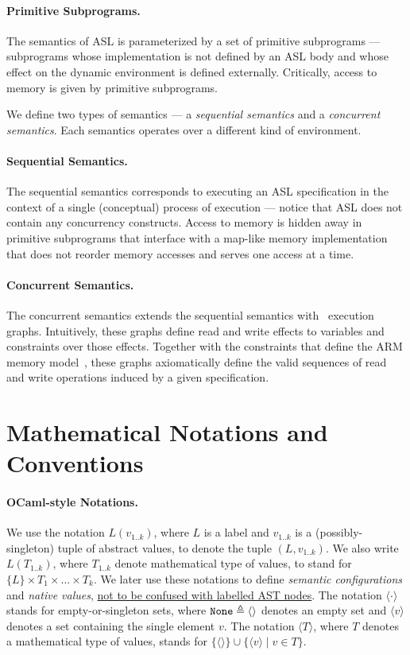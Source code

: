 \documentclass{book}
\begin{document}
\paragraph{Primitive Subprograms.}
The semantics of ASL is parameterized by a set of primitive subprograms ---
subprograms whose implementation is not defined by an ASL body and whose effect on the dynamic environment
is defined externally. Critically, access to memory is given by primitive subprograms.

We define two types of semantics --- a \emph{sequential semantics} and a \emph{concurrent semantics}.
Each semantics operates over a different kind of environment.

\paragraph{Sequential Semantics.}
The sequential semantics corresponds to executing an ASL specification in the context of a single (conceptual) process
of execution --- notice that ASL does not contain any concurrency constructs. Access to memory is hidden away
in primitive subprograms that interface with a map-like memory implementation that does not reorder memory accesses
and serves one access at a time.

\paragraph{Concurrent Semantics.}
The concurrent semantics extends the sequential semantics with \herd\ execution graphs.
Intuitively, these graphs define read and write effects to variables and constraints over those effects.
Together with the constraints that define the ARM memory model~\cite{AlglaveDGHM21}, these graphs axiomatically define
the valid sequences of read and write operations induced by a given specification.

\section{Mathematical Notations and Conventions}



\paragraph{OCaml-style Notations.}
We use the notation $L(v_{1..k})$, where $L$ is a label and $v_{1..k}$ is a (possibly-singleton) tuple of abstract values,
to denote the tuple $(L,v_{1..k})$.
We also write $L(T_{1..k})$, where $T_{1..k}$ denote mathematical type of values, to stand for
$\{L\} \times T_1 \times \ldots \times T_k$.
%
We later use these notations to define \emph{semantic configurations} and \emph{native values}, \underline{not to be confused with labelled AST nodes}.
%
The notation $\langle \cdot \rangle$ stands for empty-or-singleton sets, where $\texttt{None}\triangleq\langle\rangle$ denotes
an empty set and $\langle v \rangle$ denotes a set containing the single element $v$.
%
The notation $\langle T \rangle$, where $T$ denotes a mathematical type of values, stands for
$\{ \langle\rangle \} \cup \{\langle v \rangle \;|\; v \in T\}$.
\end{document}
